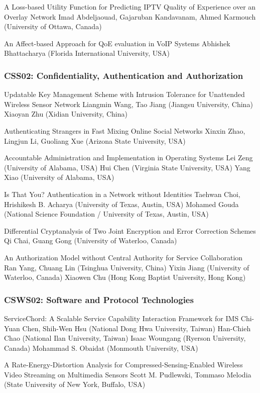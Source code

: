 \documentclass[•]{article}
\begin{document}
A Loss-based Utility Function for Predicting IPTV Quality of Experience over an Overlay Network
Imad Abdeljaouad, Gajaruban Kandavanam, Ahmed Karmouch (University of Ottawa, Canada)

An Affect-based Approach for QoE evaluation in VoIP Systems
Abhishek Bhattacharya (Florida International University, USA)

\subsubsection{CSS02: Confidentiality, Authentication and Authorization}
Updatable Key Management Scheme with Intrusion Tolerance for Unattended Wireless Sensor Network
Liangmin Wang, Tao Jiang (Jiangsu University, China)
Xiaoyan Zhu (Xidian University, China)

Authenticating Strangers in Fast Mixing Online Social Networks
Xinxin Zhao, Lingjun Li, Guoliang Xue (Arizona State University, USA)

Accountable Administration and Implementation in Operating Systems
Lei Zeng (University of Alabama, USA)
Hui Chen (Virginia State University, USA)
Yang Xiao (University of Alabama, USA)

Is That You? Authentication in a Network without Identities
Taehwan Choi, Hrishikesh B. Acharya (University of Texas, Austin, USA)
Mohamed Gouda (National Science Foundation / University of Texas, Austin, USA)

Differential Cryptanalysis of Two Joint Encryption and Error Correction Schemes
Qi Chai, Guang Gong (University of Waterloo, Canada)

An Authorization Model without Central Authority for Service Collaboration
Ran Yang, Chuang Lin (Tsinghua University, China)
Yixin Jiang (University of Waterloo, Canada)
Xiaowen Chu (Hong Kong Baptist University, Hong Kong)


\subsubsection{CSWS02: Software and Protocol Technologies}
ServiceChord: A Scalable Service Capability Interaction Framework for IMS
Chi-Yuan Chen, Shih-Wen Hsu (National Dong Hwa University, Taiwan)
Han-Chieh Chao (National Ilan University, Taiwan)
Isaac Woungang (Ryerson University, Canada)
Mohammad S. Obaidat (Monmouth University, USA)

A Rate-Energy-Distortion Analysis for Compressed-Sensing-Enabled Wireless Video Streaming on Multimedia Sensors
Scott M. Pudlewski, Tommaso Melodia (State University of New York, Buffalo, USA)


\end{document}
